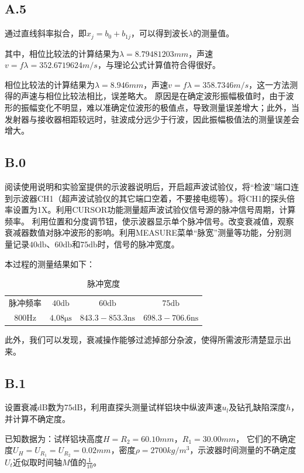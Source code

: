 \documentclass[UTF8,a4paper]{article}%
\begin{document}
\subsection*{A.5}
通过直线斜率拟合，即$x_j=b_0+b_{1j}$，可以得到波长$\lambda$的测量值。

其中，相位比较法的计算结果为$\lambda=8.79481203\unit{mm}$，声速$v=f\lambda=352.6719624\unit{m/s}$，与理论公式计算值符合得很好。

相位比较法的计算结果为$\lambda=8.946\unit{mm}$，声速$v=f\lambda=358.7346\unit{m/s}$，这一方法测得的声速与相位比较法相比，误差略大。
原因是在确定波形振幅极值时，由于波形的振幅变化不明显，难以准确定位波形的极值点，导致测量误差增大；此外，当发射器与接收器相距较远时，驻波成分远少于行波，因此振幅极值法的测量误差会增大。
\subsection*{B.0}
阅读使用说明和实验室提供的示波器说明后，开启超声波试验仪，将“检波”端口连到示波器CH1（超声波试验仪的其它端口空着，不要接电缆等）。将CH1的探头倍率设置为1X。利用CURSOR功能测量超声波试验仪信号源的脉冲信号周期，计算频率。
利用位置和分度调节钮，使示波器显示单个脉冲信号。改变衰减值，观察衰减器数值对脉冲波形的影响。利用MEASURE菜单“脉宽”测量等功能，分别测量记录$40\unit{\decibel}$、$60\unit{\decibel}$和$75\unit{\decibel}$时，信号的脉冲宽度。

本过程的测量结果如下：
\begin{table}[H]
    \centering
    \caption{脉冲宽度}
    \label{tab:b0}
    \begin{tabular}{cccc}
        \hline
        脉冲频率               & $40\unit{\decibel}$        & $60\unit{\decibel}$              & $75\unit{\decibel}$              \\
        $800\unit{\hertz}$ & $4.08\unit{\micro\second}$ & $843.3-853.3\unit{\nano\second}$ & $698.3-706.6\unit{\nano\second}$ \\ \hline
    \end{tabular}
\end{table}
此外，我们可以发现，衰减操作能够过滤掉部分杂波，使得所需波形清楚显示出来。
\subsection*{B.1}
设置衰减$\unit{\dB}$数为$75\unit{\dB}$，利用直探头测量试样铝块中纵波声速$u_l$及钻孔缺陷深度$h$，并计算不确定度。

已知数据为：试样铝块高度$H=R_2=60.10\unit{mm}$，$R_1=30.00\unit{mm}$，
它们的不确定度$U_H=U_{R_1}=U_{R_2}=0.02\unit{mm}$，密度$\rho=2700\unit{kg/m^3}$，示波器时间测量的不确定度$U_t$近似取时间轴$M$值的$\frac{1}{10}$。
\end{document}
